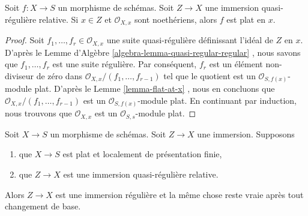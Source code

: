 \begin{lemma}
\label{lemma-quasi-regular-immersion-flat-at-x}
Soit  $f : X \to S$  un morphisme de schémas. Soit  $Z \to X$  une immersion
quasi-régulière relative. Si  $x \in Z$  et  $\mathcal{O}_{X, x}$  sont noethériens, alors
 $f$  est plat en  $x$.
\end{lemma}

\begin{proof}
Soit  $f_1, \ldots, f_r \in \mathcal{O}_{X, x}$  une suite quasi-régulière définissant l'idéal de  $Z$  en
 $x$. D'après le Lemme d'Algèbre  \ref{algebra-lemma-quasi-regular-regular} , nous savons que
 $f_1, \ldots, f_r$  est une suite régulière. Par conséquent,  $f_r$  est un élément
non-diviseur de zéro dans  $\mathcal{O}_{X, x}/(f_1, \ldots, f_{r - 1})$  tel que le quotient est un
 $\mathcal{O}_{S, f(x)}$-module plat. D'après le Lemme  \ref{lemma-flat-at-x} , nous en concluons que
 $\mathcal{O}_{X, x}/(f_1, \ldots, f_{r - 1})$  est un  $\mathcal{O}_{S, f(x)}$-module plat. En continuant par induction, nous
trouvons que  $\mathcal{O}_{X, x}$  est un  $\mathcal{O}_{S, s}$-module plat.
\end{proof}

\begin{lemma}
\label{lemma-relative-regular-immersion-flat-in-neighbourhood}
Soit  $X \to S$  un morphisme de schémas. Soit  $Z \to X$  une immersion.
Supposons
\begin{enumerate}
\item que $X \to S$  est plat et localement de présentation finie,
\item que $Z \to X$  est une immersion quasi-régulière relative.
\end{enumerate}
Alors  $Z \to X$  est une immersion régulière et la même chose reste vraie après
tout changement de base.
\end{lemma}

